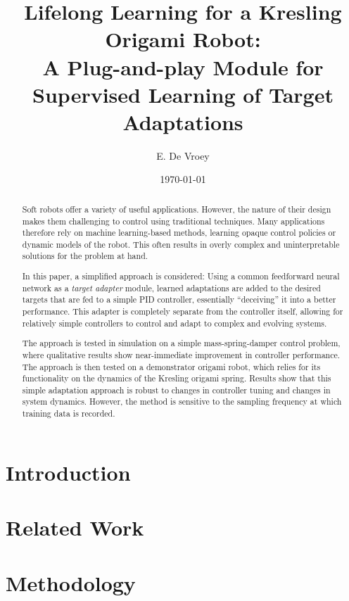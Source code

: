 \documentclass[a4paper, 10pt, twoside]{IEEEtran}
\title{Lifelong Learning for a Kresling Origami Robot:\\
{\LARGE A Plug-and-play Module for Supervised Learning of Target Adaptations}}
\author{E. De Vroey}
\date{\today}
\begin{document}
    \maketitle

    \begin{abstract}
        Soft robots offer a variety of useful applications.
        However, the nature of their design makes them challenging to control using traditional techniques.
        Many applications therefore rely on machine learning-based methods, learning opaque control policies or dynamic models of the robot.
        This often results in overly complex and uninterpretable solutions for the problem at hand.

        In this paper, a simplified approach is considered:
        Using a common feedforward neural network as a \emph{target adapter} module,
        learned adaptations are added to the desired targets that are fed to a simple PID controller, essentially ``deceiving'' it into a better performance.
        This adapter is completely separate from the controller itself, allowing for relatively simple controllers to control and adapt to complex and evolving systems.

        The approach is tested in simulation on a simple mass-spring-damper control problem, where qualitative results show near-immediate improvement in controller performance.
        The approach is then tested on a demonstrator origami robot, which relies for its functionality on the dynamics of the Kresling origami spring.
        Results show that this simple adaptation approach is robust to changes in controller tuning and changes in system dynamics.
        However, the method is sensitive to the sampling frequency at which training data is recorded.
    \end{abstract}
    \FloatBarrier

    \section{Introduction}\label{sec:introduction}
    


    \section{Related Work}\label{sec:background}
    


    \section{Methodology}\label{sec:methodology}
    
\end{document}
